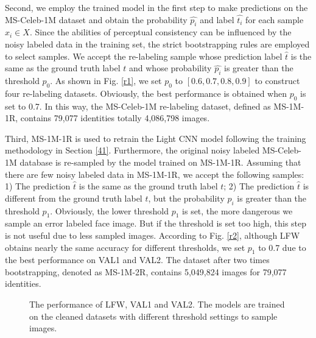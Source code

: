 \documentclass[journal,transmag]{IEEEtran}
\begin{document}
Second, we employ the trained model in the first step to make predictions on the MS-Celeb-1M dataset and obtain the probability $\hat{p_i}$ and label $\hat{t_i}$ for each sample $x_i\in X$. Since the abilities of perceptual consistency can be influenced by the noisy labeled data in the training set, the strict bootstrapping rules are employed to select samples. We accept the re-labeling sample whose prediction label $\hat{t}$ is the same as the ground truth label $t$ and whose probability $\hat{p_i}$ is greater than the threshold $p_0$. As shown in Fig. \ref{r1}, we set $p_0$ to $[0.6, 0.7, 0.8, 0.9]$ to construct four re-labeling datasets. Obviously, the best performance is obtained when $p_0$ is set to 0.7. In this way, the MS-Celeb-1M re-labeling dataset, defined as MS-1M-1R, contains 79,077 identities totally 4,086,798 images.


Third, MS-1M-1R is used to retrain the Light CNN model following the training methodology in Section \ref{41}.
Furthermore, the original noisy labeled MS-Celeb-1M database is re-sampled by the model trained on MS-1M-1R. Assuming that there are few noisy labeled data in MS-1M-1R, we accept the following samples:
1) The prediction $\hat{t}$ is the same as the ground truth label $t$; 2) The prediction $\hat{t}$ is different from the ground truth label $t$, but the probability $p_i$ is greater than the threshold $p_1$. Obviously, the lower threshold $p_1$ is set, the more dangerous we sample an error labeled face image. But if the threshold is set too high, this step is not useful due to less sampled images. According to Fig. \ref{r2}, although LFW obtains nearly the same accuracy for different thresholds, we set $p_1$ to 0.7 due to the best performance on VAL1 and VAL2. The dataset after two times bootstrapping, denoted as MS-1M-2R, contains 5,049,824 images for 79,077 identities.

\begin{figure}
\caption{The performance of LFW, VAL1 and VAL2. The models are trained on the cleaned datasets with different threshold settings to sample images.}
\end{figure}
\end{document}
